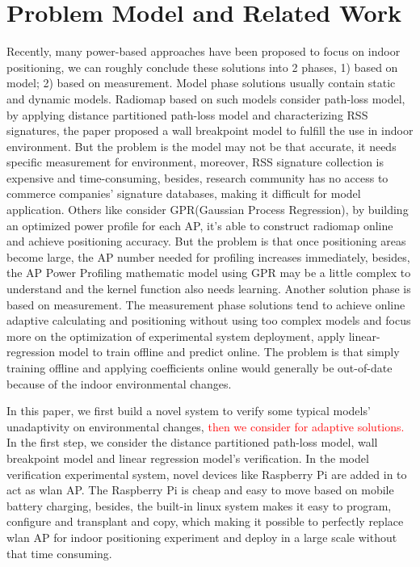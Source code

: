 \documentclass[10pt,conference]{IEEEtran}
\newcommand{\yc}[1]{\textcolor{red}{#1}}
\begin{document}

\section{Problem Model and Related Work}
Recently, many power-based approaches have been proposed to focus on indoor positioning, we can roughly conclude these solutions into 2 phases, 1) based on model; 2) based on measurement. Model phase solutions usually contain static and dynamic models. Radiomap based on such models \cite{site} consider path-loss model, by applying distance partitioned path-loss model and characterizing RSS signatures, the paper proposed a wall breakpoint model to fulfill the use in indoor environment. But the problem is the model may not be that accurate, it needs specific measurement for environment, moreover, RSS signature collection is expensive and time-consuming, besides, research community has no access to commerce companies' signature databases, making it difficult for model application. Others like \cite{dynamic} consider GPR(Gaussian Process Regression), by building an optimized power profile for each AP, it's able to construct radiomap online and achieve positioning accuracy. But the problem is that once positioning areas become large, the AP number needed for profiling increases immediately, besides, the AP Power Profiling mathematic model using GPR may be a little complex to understand and the kernel function also needs learning. Another solution phase is based on measurement. The measurement phase solutions tend to achieve online adaptive calculating and positioning without using too complex models and focus more on the optimization of experimental system deployment, apply linear-regression model to train offline and predict online. The problem is that simply training offline and applying coefficients online would generally be out-of-date because of the indoor environmental changes.

In this paper, we first build a novel system to verify some typical models' unadaptivity on environmental changes, \yc{then we consider for adaptive solutions.} In the first step, we consider the distance partitioned path-loss model, wall breakpoint model and linear regression model's verification. In the model verification experimental system, novel devices like Raspberry Pi are added in to act as wlan AP. The Raspberry Pi is cheap and easy to move based on mobile battery charging, besides, the built-in linux system makes it easy to program, configure and transplant and copy, which making it possible to perfectly replace wlan AP for indoor positioning experiment and deploy in a large scale without that time consuming.
\end{document}
